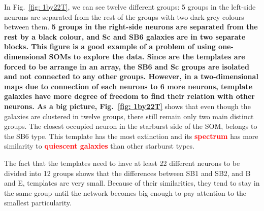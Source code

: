             In Fig.~\ref{fig: 1by22T}, we can see twelve different groups:
            5 groups in the left-side neurons are separated from the rest of the groups with two dark-grey colours between them.
            \textbf{5 groups in the right-side neurons are separated from the rest by a black colour, and Sc and SB6 galaxies are in two separate blocks.
            This figure is a good example of a problem of using one-dimensional SOMs to explore the data.
            Since are the templates are forced to be arrange in an array, the SB6 and Sc groups are isolated and not connected to any other groups.
            However, in a two-dimensional maps due to connection of each neurons to 6 more neurons, template galaxies have more degree of freedom to find their relation with other neurons.
            As a big picture, Fig.~\ref{fig: 1by22T}} shows that even though the galaxies are clustered in twelve groups, there still remain only two main distinct groups.
            The closest occupied neuron in the starburst side of the SOM, belongs to the SB6 type. 
            This template has the most extinction and its \textbf{\textcolor{red}{spectrum}} has more similarity to \textbf{\textcolor{red}{quiescent galaxies}} than other starburst types. 
            
            The fact that the templates need to have at least 22 different neurons to be divided into 12 groups shows that the differences between SB1 and SB2, and B and E, templates are very small.
            Because of their similarities, they tend to stay in the same group until the network becomes big enough to pay attention to the smallest particularity.
           
